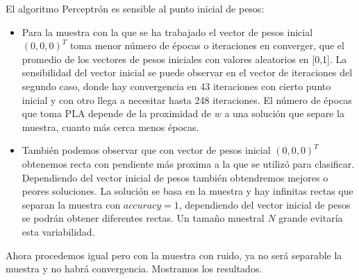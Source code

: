 \documentclass[11pt,a4paper]{article}
\theoremstyle{definition}
\begin{document}
		El algoritmo Perceptrón es sensible al punto inicial de pesos:
		\begin{itemize}
		\item Para la muestra con la que se ha trabajado el vector de pesos inicial $(0,0,0)^T$ toma menor número de épocas o iteraciones en converger, que el promedio de los vectores de pesos iniciales con valores aleatorios en [0,1]. La sensibilidad del vector inicial se puede observar en el vector de iteraciones del segundo caso, donde hay convergencia en 43 iteraciones con cierto punto inicial y con otro llega a necesitar hasta 248 iteraciones. El número de épocas que toma PLA depende de la proximidad de $w$ a una solución que separe la muestra, cuanto más cerca menos épocas.
		
		\item También podemos observar que con vector de pesos inicial $(0,0,0)^T$ obtenemos recta con pendiente más proxima a la que se utilizó para clasificar. Dependiendo del vector inicial de pesos también obtendremos mejores o peores soluciones. La solución se basa en la muestra y hay infinitas rectas que separan la muestra con $accuracy=1$, dependiendo del vector inicial de pesos se podrán obtener diferentes rectas. Un tamaño muestral $N$ grande evitaría esta variabilidad.
		\end{itemize}
		Ahora procedemos igual pero con la muestra con ruido, ya no será separable la muestra y no habrá convergencia. Mostramos los resultados.
\end{document}
